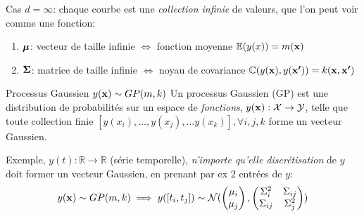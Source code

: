 \documentclass[xcolor=svgnames, t]{beamer}
\newcommand{\vectorx}[1]{\boldsymbol{\MakeLowercase{\mathbf{#1}}}}
\newcommand{\matrixx}[1]{\boldsymbol{\MakeUppercase{#1}}}
\newcommand{\coloredemph}[1]{\textcolor{internationalblue}{\emph{#1}}}
\begin{document}
%

\begin{frame}{\subsecname}
  
  Cas $d=\infty$: chaque courbe est une \coloredemph{collection infinie} de valeurs, que l'on peut voir comme une fonction:
  \begin{enumerate}
    \item $\vectorx{\mu}$: vecteur de taille infinie $\Leftrightarrow$ fonction moyenne $\mathbb{E}(y(x)) = m(\vectorx{x})$
    \item $\matrixx{\Sigma}$: matrice de taille infinie $\Leftrightarrow$  noyau de covariance 
    $\mathbb{C}( y(\vectorx{x}), y(\vectorx{x^\prime}) ) = k(\vectorx{x}, \vectorx{x^{\prime}})$
  \end{enumerate}
  \pause
  \begin{block}{Processus Gaussien $y(\vectorx{x}) \sim GP(m, k)$}
    Un processus Gaussien (GP) est une distribution de probabilités sur un espace de \coloredemph{fonctions},
    $y(\vectorx{x}): \mathcal{X} \to \mathcal{Y}$, telle que toute collection finie
    $[ y(x_i), \dots, y(x_j), \dots y(x_k) ], \forall i,j,k$ forme un vecteur Gaussien. 
  \end{block}
  \pause
  Exemple, $y(t): \mathbb{R} \to \mathbb{R}$ (série temporelle), \coloredemph{n'importe qu'elle discrétisation} de $y$ doit
   former un vecteur Gaussien, en prenant par ex $2$ entrées de $y$:
  \begin{equation*}
    y(\vectorx{x}) \sim GP(m, k) \implies
    y([t_i, t_j]) \sim \mathcal{N} (
      \begin{pmatrix}
        \mu_i \\
        \mu_j 
      \end{pmatrix},
      \begin{pmatrix}
        \Sigma_{i}^2 & \Sigma_{ij} \\
        \Sigma_{ij} & \Sigma_{j}^2
      \end{pmatrix}
      )
  \end{equation*}
\end{frame}
\end{document}
